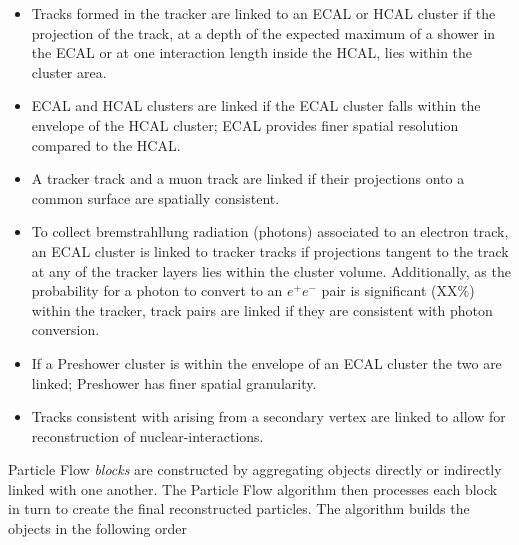 \begin{itemize}
\item Tracks formed in the tracker are linked to an ECAL or HCAL cluster if the projection of the track, at a depth of the expected maximum of a shower in the ECAL or at one interaction length inside the HCAL, lies within the cluster area.
\item ECAL and HCAL clusters are linked if the ECAL cluster falls within the envelope of the HCAL cluster; ECAL provides finer spatial resolution compared to the HCAL.
\item A tracker track and a muon track are linked if their projections onto a common surface are spatially consistent.
\item To collect bremstrahllung radiation (photons) associated to an electron track, an ECAL cluster is linked to tracker tracks if projections tangent to the track at any of the tracker layers lies within the cluster volume. Additionally, as the probability for a photon to convert to an $e^{+}e^{-}$ pair is significant (XX\%) within the tracker, track pairs are linked if they are consistent with photon conversion.
\item If a Preshower cluster is within the envelope of an ECAL cluster the two are linked; Preshower has finer spatial granularity.
\item Tracks consistent with arising from a secondary vertex are linked to allow for reconstruction of nuclear-interactions.
\end{itemize}

Particle Flow \textit{blocks} are constructed by aggregating objects directly or indirectly linked with one another. The Particle Flow algorithm then processes each block in turn to create the final reconstructed particles. The algorithm builds the objects in the following order

